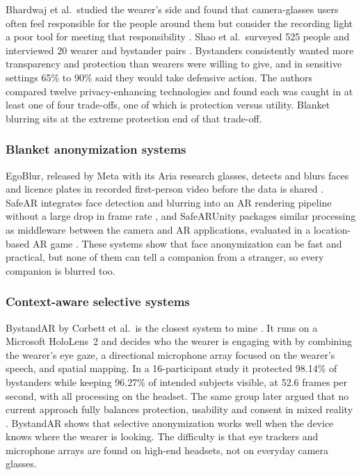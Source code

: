 Bhardwaj et al.\ studied the wearer's side and found that camera-glasses users often feel
responsible for the people around them but consider the recording light a poor tool for
meeting that responsibility \cite{bhardwaj2024}. Shao et al.\ surveyed 525 people and
interviewed 20 wearer and bystander pairs \cite{mindthegap2026}. Bystanders consistently
wanted more transparency and protection than wearers were willing to give, and in sensitive
settings 65\% to 90\% said they would take defensive action. The authors compared twelve
privacy-enhancing technologies and found each was caught in at least one of four
trade-offs, one of which is protection versus utility. Blanket blurring sits at the
extreme protection end of that trade-off.

\subsubsection{Blanket anonymization systems}

EgoBlur, released by Meta with its Aria research glasses, detects and blurs faces and
licence plates in recorded first-person video before the data is shared
\cite{egoblur2023}. SafeAR integrates face detection and blurring into an AR rendering
pipeline without a large drop in frame rate \cite{safear2025}, and SafeARUnity packages
similar processing as middleware between the camera and AR applications, evaluated in a
location-based AR game \cite{safearunity2025}. These systems show that face anonymization
can be fast and practical, but none of them can tell a companion from a stranger, so every
companion is blurred too.

\subsubsection{Context-aware selective systems}

BystandAR by Corbett et al.\ is the closest system to mine \cite{bystandar}. It runs on a
Microsoft HoloLens~2 and decides who the wearer is engaging with by combining the wearer's
eye gaze, a directional microphone array focused on the wearer's speech, and spatial
mapping. In a 16-participant study it protected 98.14\% of bystanders while keeping
96.27\% of intended subjects visible, at 52.6 frames per second, with all processing on the
headset. The same group later argued that no current approach fully balances protection,
usability and consent in mixed reality \cite{corbett2024ieee}. BystandAR shows that
selective anonymization works well when the device knows where the wearer is looking. The
difficulty is that eye trackers and microphone arrays are found on high-end headsets, not
on everyday camera glasses.

